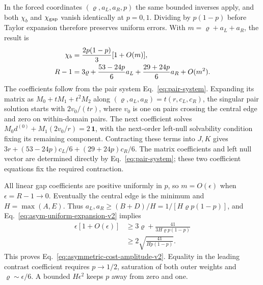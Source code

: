 \documentclass[aps,pre,reprint,amsmath,amssymb,longbibliography]{revtex4-2}
\newcommand{\one}{\bm 1}
\begin{document}
In the forced coordinates $(\varrho,a_L,a_R,p)$ the same
bounded inverses apply, and both $\chi_b$ and $\chi_{\rm gap}$ vanish
identically at $p=0,1$. Dividing by $p(1-p)$ before Taylor expansion
therefore preserves uniform errors. With
$m=\varrho+a_L+a_R$, the result is
 \begin{align}
 \chi_b&=\frac{2p(1-p)}3[1+O(m)],  \label{eq:asym-uniform-expansion-v2}
\\
 R-1&=3\varrho+\frac{53-24p}{6}a_L
                    +\frac{29+24p}{6}a_R+O(m^2). \notag
 \end{align}
The coefficients follow from the pair system
Eq.~\eqref{eq:pair-system}.  Expanding its matrix as
$M_0+tM_1+t^2M_2$ along
$(\varrho,a_L,a_R)=t(r,c_L,c_R)$, the singular pair solution
starts with $2v_0/(tr)$, where $v_0$ is one on pairs crossing the
central edge and zero on within-domain pairs. The next coefficient
solves $M_0d^{(0)}+M_1(2v_0/r)=2\,\one$, with the next-order left-null
solvability condition fixing its remaining component.
Contracting these terms into $J,K$ gives
$3r+(53-24p)c_L/6+(29+24p)c_R/6$. The matrix coefficients and left null vector are determined directly
by Eq.~\eqref{eq:pair-system}; these two coefficient equations fix the
required contraction.

All linear gap coefficients are positive uniformly in $p$,
so $m=O(\epsilon)$ when $\epsilon=R-1\to0$. Eventually the
central edge is the minimum and $H=\max(A,E)$. Thus
$a_L,a_R\ge(B+D)/H=1/[H\varrho p(1-p)]$, and
Eq.~\eqref{eq:asym-uniform-expansion-v2} implies
\begin{equation}
 \begin{aligned}
 \epsilon[1+O(\epsilon)]
 &\ge3\varrho+\frac{41}{3H\varrho p(1-p)}\\
 &\ge2\sqrt{\frac{41}{Hp(1-p)}}.
 \end{aligned}
 \label{eq:asym-budget-bound-v2}
\end{equation}
This proves Eq.~\eqref{eq:asymmetric-cost-amplitude-v2}.
Equality in the leading contrast coefficient requires $p\to1/2$,
saturation of both outer weights and $\varrho\sim\epsilon/6$.
A bounded $H\epsilon^2$ keeps $p$ away from zero and one.
\end{document}
